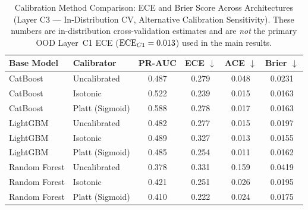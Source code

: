 \begin{table}[htbp]
\centering
\caption[Calibration method comparison (Layer C3, in-distribution CV)]{Calibration Method Comparison: ECE and Brier Score Across Architectures (Layer C3 --- In-Distribution CV, Alternative Calibration Sensitivity). These numbers are in-distribution cross-validation estimates and are \textit{not} the primary OOD Layer~C1 ECE ($\text{ECE}_{C1} = 0.013{}$) used in the main results.}
\label{tab:calibration_benchmark}
\renewcommand{\arraystretch}{1.2}
\begin{tabular}{llcccc}
\toprule
\textbf{Base Model} & \textbf{Calibrator} & \textbf{PR-AUC} & \textbf{ECE $\downarrow$} & \textbf{ACE $\downarrow$} & \textbf{Brier $\downarrow$} \\
\midrule
CatBoost & Uncalibrated & 0.487 & 0.279 & 0.048 & 0.0231 \\
CatBoost & Isotonic & 0.522 & 0.239 & 0.015 & 0.0163 \\
CatBoost & Platt (Sigmoid) & 0.588 & 0.278 & 0.017 & 0.0163 \\
LightGBM & Uncalibrated & 0.482 & 0.277 & 0.015 & 0.0197 \\
LightGBM & Isotonic & 0.489 & 0.327 & 0.013 & 0.0155 \\
LightGBM & Platt (Sigmoid) & 0.485 & 0.254 & 0.011 & 0.0162 \\
Random Forest & Uncalibrated & 0.378 & 0.331 & 0.159 & 0.0419 \\
Random Forest & Isotonic & 0.421 & 0.251 & 0.026 & 0.0195 \\
Random Forest & Platt (Sigmoid) & 0.410 & 0.222 & 0.024 & 0.0175 \\
\bottomrule
\end{tabular}
\end{table}